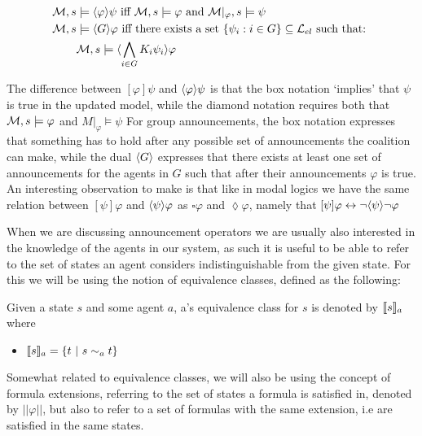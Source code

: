\begin{definition} \hfill
	\label{def:dual}
	\begin{align*}
		\mathcal{M},s &\models \langle\varphi\rangle\psi\textrm{ iff }\mathcal{M},s \models \varphi\textrm{ and }\mathcal{M}|_\varphi,s \models \psi \\
		\mathcal{M},s &\models \langle G\rangle\varphi \textrm{ iff there exists a set }\{\psi_i:i\in G\} \subseteq \textrm{$\mathcal{L}_{el}$ such that: }\\
			   &\mathcal{M},s \models \langle\bigwedge_{i\in G}K_i\psi_i\rangle\varphi
	\end{align*}

\end{definition}

The difference between $[\varphi]\psi$ and $\langle\varphi\rangle\psi$ is that the box notation `implies' that $\psi$ is true in the updated model,  while the diamond notation requires both that $\mathcal{M},s\models \varphi$ and $M|_\varphi \models \psi$ For group announcements, the box notation expresses that something has to hold after any possible set of announcements the coalition can make, while the dual $\langle G\rangle$ expresses that there exists at least one set of announcements for the agents in $G$ such that after their announcements $\varphi$ is true. An interesting observation to make is that like in modal logics we have the same relation between $[\psi]\varphi$ and $\langle\psi\rangle\varphi$ as $\square\varphi$ and $\lozenge\varphi$, namely that $[\psi]\varphi \leftrightarrow \neg\langle\psi\rangle\neg\varphi$

When we are discussing announcement operators we are usually also interested in the knowledge of the agents in our system, as such it is useful to be able to refer to the set of states an agent considers indistinguishable from the given state. For this we will be using the notion of equivalence classes, defined as the following:

\begin{definition}
	\label{def:eqclass}
	Given a state $s$ and some agent $a$, a's equivalence class for $s$ is denoted by $\llbracket s\rrbracket_a$ where
	\begin{itemize}
		\item[] $\llbracket s\rrbracket_a = \{t~|~s\sim_a t\}$
	\end{itemize}
\end{definition}

Somewhat related to equivalence classes, we will also be using the concept of formula extensions, referring to the set of states a formula is satisfied in, denoted by $||\varphi||$, but also to refer to a set of formulas with the same extension, i.e are satisfied in the same states.

